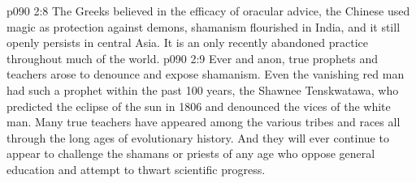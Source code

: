 \vs p090 2:8 The Greeks believed in the efficacy of oracular advice, the Chinese used magic as protection against demons, shamanism flourished in India, and it still openly persists in central Asia. It is an only recently abandoned practice throughout much of the world.
\vs p090 2:9 Ever and anon, true prophets and teachers arose to denounce and expose shamanism. Even the vanishing red man had such a prophet within the past 100 years, the Shawnee Tenskwatawa, who predicted the eclipse of the sun in 1806 and denounced the vices of the white man. Many true teachers have appeared among the various tribes and races all through the long ages of evolutionary history. And they will ever continue to appear to challenge the shamans or priests of any age who oppose general education and attempt to thwart scientific progress.
